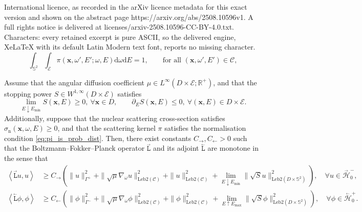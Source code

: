 \documentclass[10pt,a4paper]{amsart}
\newcommand{\bL}{\stackrel{_\leftarrow}{\mathtt L}}
\newcommand{\cH}{\stackrel{_\rightarrow}{\mathscr H}}
\newcommand{\cbH}{\stackrel{_\leftarrow}{\mathscr H}}
\newcommand{\dd}{{\mathrm d}}
\newcommand{\fL}{\stackrel{_\rightarrow}{\mathtt L}}
\newcommand{\leb}{\text{Leb}}
\newcommand{\ltwop}[2]{\ensuremath{\!\left\langle{#1,#2}\right\rangle}}
\renewcommand{\vec}[1]{\ensuremath{\boldsymbol{#1}}}
\begin{document}
International licence, as recorded in the arXiv licence metadata for this exact version and shown on the abstract page https://arxiv.org/abs/2508.10596v1. A full rights notice is delivered at licenses/arxiv-2508.10596-CC-BY-4.0.txt. Characters: every retained excerpt is pure ASCII, so the delivered engine, XeLaTeX with its default Latin Modern text font, reports no missing character.
\begin{equation}
  \int_{\mathbb{S}^2} \int_{\mathcal{E}} 
  \pi(\vec{x}, \omega', E';  \omega,  E)\dd \omega\dd E = 1,
  \qquad \text{for all } (\vec{x}, \omega', E') \in \mathcal{C},
  \label{eq:pi_is_prob_dist}
\end{equation}

\begin{lemma}
  \label{lemma:monotone}
  Assume that the angular diffusion coefficient $\mu \in
  L^{\infty}(D \times \mathcal{E}; \mathbb{R}^+)$, and that the
  stopping power $S \in W^{1,\infty}(D \times \mathcal{E})$
  satisfies
  \begin{equation}
    \lim_{E \downarrow E_{\min}} S(\vec x, E) \geq 0,~ \forall \vec x \in D, 
    \qquad 
    \partial_E S(\vec x, E) \leq 0,~ \forall (\vec x, E) \in D \times \mathcal{E}.
  \end{equation}
  Additionally, suppose that the nuclear scattering cross-section satisfies
  $\sigma_{\mathrm{n}}(\vec{x}, \omega, E) \geq 0$, and that the scattering kernel
  $\pi$ satisfies the normalisation condition \eqref{eq:pi_is_prob_dist}.
  Then, there exist constants $C_{\rightarrow}, C_{\leftarrow} > 0$ such that the
  Boltzmann--Fokker--Planck operator $\fL$ and its adjoint $\bL$ are
  monotone in the sense that
  \begin{equation}
    \begin{aligned}
        \ltwop{\fL u}{u} 
        &\geq
        C_{\rightarrow} \left(\|u\|^2_{\Gamma^+} 
        + \|\sqrt{\mu}\nabla_{\omega}u\|^2_{\leb2(\mathcal{C})} 
        + \|u\|^2_{\leb2(\mathcal{C})} 
        + \lim_{E \downarrow E_{\min}} \|\sqrt{S}u\|^2_{\leb2(D\times \mathbb{S}^2)} \right),
        \quad \forall u \in \cH_0^-, 
    \\ 
        \ltwop{\bL \phi}{\phi} 
        &\geq 
        C_{\leftarrow} \left(\|\phi\|^2_{\Gamma^-} 
        + \|\sqrt{\mu}\nabla_{\omega}\phi\|^2_{\leb2(\mathcal{C})} 
        + \|\phi\|^2_{\leb2(\mathcal{C})} 
        + \lim_{E \uparrow E_{\max}} \|\sqrt{S}\phi\|^2_{\leb2(D\times \mathbb{S}^2)} \right), 
        \quad \forall \phi \in \cbH_0^+.
    \end{aligned}
  \end{equation}
\end{lemma}
\end{document}
